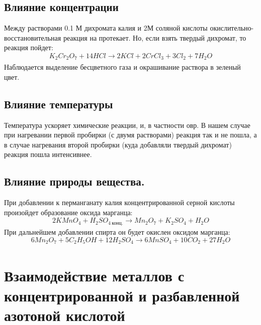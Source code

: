 \documentclass[a4paper, 12pt]{article}
\begin{document}
\subsection{Влияние концентрации}
Между растворами 0.1 М дихромата калия и 2М соляной кислоты окислительно-восстановительная реакция на протекает. Но, если взять твердый дихромат, то реакция пойдет:
\begin{equation}
    K_2Cr_2O_7 + 14HCl \xrightarrow[]{} 2KCl + 2CrCl_3 + 3Cl_2 + 7H_2 O
\end{equation}
Наблюдается выделение бесцветного газа и окрашивание раствора в зеленый цвет.
\subsection{Влияние температуры}
Температура ускоряет химические реакции, и, в частности овр. В нашем случае при нагревании первой пробирки (с двумя растворами) реакция так и не пошла, а в случае нагревания второй пробирки (куда добавляли твердый дихромат) реакция пошла интенсивнее.
\subsection{Влияние природы вещества.}
При добавлении к перманганату калия концентрированной серной кислоты произойдет образование оксида марганца:
\begin{equation}
    2KMnO_4 + H_2SO_{4 ~\text{конц.}} \xrightarrow[]{} Mn_2O_7
 + K_2SO_4 + H_2O\end{equation}
При дальнейшем добавлении спирта он будет окислен оксидом марганца:
\begin{equation}
    6Mn_2O_7 + 5C_2H_5OH + 12H_2SO_4 \xrightarrow[]{} 6MnSO_4 + 10CO_2 + 27H_2O
\end{equation}
\section{Взаимодействие металлов с концентрированной и разбавленной азотоной кислотой}
\end{document}
